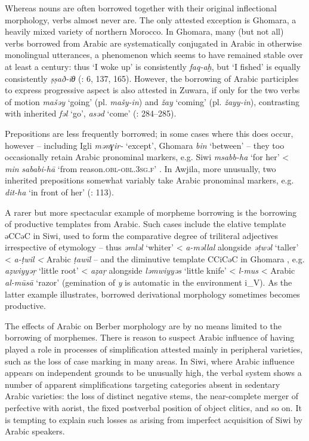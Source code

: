 \documentclass[output=paper]{langsci/langscibook}
\begin{document}
Whereas nouns are often borrowed together with their original inflectional morphology, verbs almost never are. The only attested exception is Ghomara, a heavily mixed variety of northern Morocco.  In Ghomara, many (but not all) verbs borrowed from Arabic are systematically conjugated in Arabic in otherwise monolingual utterances, a phenomenon which seems to have remained stable over at least a century: thus `I woke up' is consistently \textit{faq-aḫ}, but `I fished' is equally consistently \textit{ṣṣað-iθ} (\citealt{Mourigh2016}: 6, 137, 165). However, the borrowing of Arabic participles to express progressive aspect is also attested in Zuwara, if only for the two verbs of motion \textit{mašəy} `going' (pl. \textit{mašy-in}) and \textit{žay} `coming' (pl. \textit{žayy-in}), contrasting with inherited \textit{fəl} `go', \textit{asəd} `come' (\citealt{Kossmann2013book}: 284–285).

Prepositions are less frequently borrowed; in some cases where this does occur, however – including Igli \textit{mənɣir-} `except', Ghomara \textit{bin} `between' \citep[293]{Kossmann2013book} – they too occasionally retain Arabic pronominal markers, e.g. Siwi \textit{msabb-ha} `for her' < \textit{min} \textit{sababi-hā}  `from reason.\textsc{obl}{}-\textsc{obl.3sg.f}' \citep[48]{Souag2013book}.  In Awjila, more unusually, two inherited prepositions somewhat variably take Arabic pronominal markers, e.g. \textit{dit-ha} `in front of her' (\citealt{vanPutten2014}: 113).

A rarer but more spectacular example of morpheme borrowing is the borrowing of productive templates from Arabic. Such cases include the elative template əCCəC in Siwi, used to form the comparative degree of triliteral adjectives irrespective of etymology – thus \textit{əmləl} `whiter' < \textit{a-məllal} alongside \textit{əṭwəl} `taller' < \textit{a-ṭwil} \textit{<} Arabic \textit{ṭawīl} \citep{Souag2009} – and the diminutive template CCiCəC in Ghomara \citep{Mourigh2016}, e.g. \textit{aẓwiyyəṛ} `little root' < \textit{aẓaṛ} alongside \textit{ləmwiyyəs} `little knife' < \textit{l-mus} < Arabic \textit{al-mūsā} `razor' (gemination of \textit{y} is automatic in the environment i\_V). As the latter example illustrates, borrowed derivational morphology sometimes becomes productive.

The effects of Arabic on Berber morphology are by no means limited to the borrowing of morphemes. There is reason to suspect Arabic influence of having played a role in processes of simplification attested mainly in peripheral varieties, such as the loss of case marking in many areas. In Siwi, where Arabic influence appears on independent grounds to be unusually high, the verbal system shows a number of apparent simplifications targeting categories absent in sedentary Arabic varieties: the loss of distinct negative stems, the near-complete merger of perfective with aorist, the fixed postverbal position of object clitics, and so on. It is tempting to explain such losses as arising from imperfect acquisition of Siwi by Arabic speakers.
\end{document}
